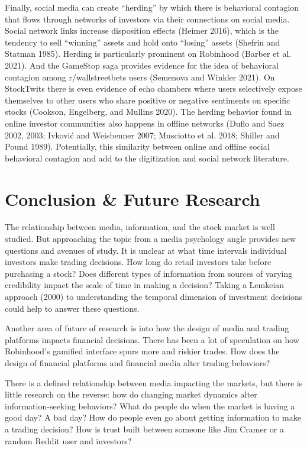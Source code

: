 \documentclass[12pt,]{article}
\begin{document}
Finally, social media can create ``herding'' by which there is
behavioral contagion that flows through networks of investors via their
connections on social media. Social network links increase disposition
effects (Heimer 2016), which is the tendency to sell ``winning'' assets
and hold onto ``losing'' assets (Shefrin and Statman 1985). Herding is
particularly prominent on Robinhood (Barber et al. 2021). And the
GameStop saga provides evidence for the idea of behavioral contagion
among r/wallstreetbets users (Semenova and Winkler 2021). On StockTwits
there is even evidence of echo chambers where users selectively expose
themselves to other users who share positive or negative sentiments on
specific stocks (Cookson, Engelberg, and Mullins 2020). The herding
behavior found in online investor communities also happens in offline
networks (Duflo and Saez 2002, 2003; Ivković and Weisbenner 2007;
Musciotto et al. 2018; Shiller and Pound 1989). Potentially, this
similarity between online and offline social behavioral contagion and
add to the digitization and social network literature.

\hypertarget{conclusion-future-research}{%
\section{Conclusion \& Future
Research}\label{conclusion-future-research}}

The relationship between media, information, and the stock market is
well studied. But approaching the topic from a media psychology angle
provides new questions and avenues of study. It is unclear at what time
intervals individual investors make trading decisions. How long do
retail investors take before purchasing a stock? Does different types of
information from sources of varying credibility impact the scale of time
in making a decision? Taking a Lemkeian approach (2000) to understanding
the temporal dimension of investment decisions could help to answer
these questions.

Another area of future of research is into how the design of media and
trading platforms impacts financial decisions. There has been a lot of
speculation on how Robinhood's gamified interface spurs more and riskier
trades. How does the design of financial platforms and financial media
alter trading behaviors?

There is a defined relationship between media impacting the markets, but
there is little research on the reverse: how do changing market dynamics
alter information-seeking behaviors? What do people do when the market
is having a good day? A bad day? How do people even go about getting
information to make a trading decision? How is trust built between
someone like Jim Cramer or a random Reddit user and investors?
\end{document}
